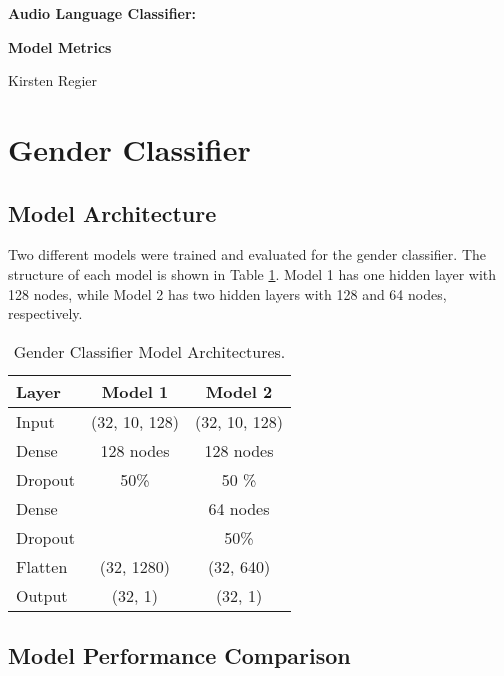\documentclass[11pt, letterpaper]{article}
\begin{document}
\begin{center}
\Large{\textbf{Audio Language Classifier:}}

\Large{\textbf{Model Metrics}}

\large{Kirsten Regier}
\end{center}

\section{Gender Classifier}
\subsection{Model Architecture}

Two different models were trained and evaluated for the gender classifier. The structure of each model is shown in Table \ref{tab:GenModels}.  Model 1 has one hidden layer with 128 nodes, while Model 2 has two hidden layers with 128 and 64 nodes, respectively.

\begin{table}[!h]
\begin{center}
\caption{Gender Classifier Model Architectures.}
\begin{tabular}{l | c | c |}

Layer  & Model 1 & Model 2\\
\hline

Input 	& (32, 10, 128) & (32, 10, 128) \\ \hline

Dense	& 128 nodes & 128 nodes \\
Dropout	& 50\%		& 50 \% \\ \hline

Dense	&			& 64 nodes \\
Dropout	& 			& 50\% \\ \hline

Flatten 	& (32, 1280)	& (32, 640) \\ \hline
Output 	& (32, 1)		& (32, 1)\\
\hline
\end{tabular}

\label{tab:GenModels}
\end{center}
\end{table}

\subsection{Model Performance Comparison}
\end{document}
